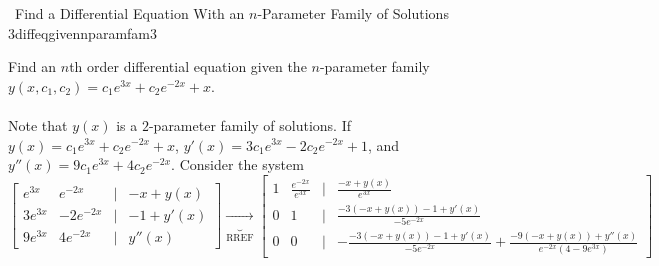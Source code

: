         \begin{example}{\Difficulty\,\Difficulty\,\,Find a Differential Equation With an \(n\)-Parameter Family of Solutions 3}{diffeqgivennparamfam3}
            
            Find an \(n\)th order differential equation given the \(n\)-parameter family \(y(x,c_1,c_2)=c_1e^{3x}+c_2e^{-2x}+x\).
            \\
            \\
            Note that \(y(x)\) is a \(2\)-parameter family of solutions. If \(y(x)=c_1e^{3x}+c_2e^{-2x}+x\), \(y'(x)=3c_1e^{3x}-2c_2e^{-2x}+1\), and \(y''(x)=9c_1e^{3x}+4c_2e^{-2x}\). Consider the system
            \begin{equation*}
                \begin{bmatrix}
                    e^{3x} & e^{-2x} & | & -x+y(x) \\
                    3e^{3x} & -2e^{-2x} & | & -1+y'(x) \\
                    9e^{3x} & 4e^{-2x} & | & y''(x)
                \end{bmatrix}\underbrace{\to}_{\text{RREF}}
                \begin{bmatrix}
                    1 & \frac{e^{-2x}}{e^{3x}} & | & \frac{-x+y(x)}{e^{3x}} \\
                    0 & 1 & | & \frac{-3(-x+y(x))-1+y'(x)}{-5e^{-2x}} \\
                    0 & 0 & | & -\frac{-3(-x+y(x))-1+y'(x)}{-5e^{-2x}}+\frac{-9(-x+y(x))+y''(x)}{e^{-2x}(4-9e^{3x})}
                \end{bmatrix}
            \end{equation*}
            \DOTHISLATER
        \end{example}